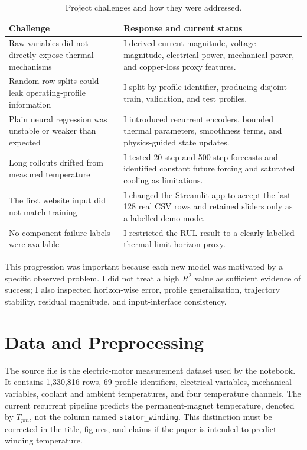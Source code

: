 \documentclass[conference]{IEEEtran}
\begin{document}
\begin{table}[!t]
\centering
\caption{Project challenges and how they were addressed.}
\label{tab:challenges}
\scriptsize
\begin{tabular}{p{}p{}}
\toprule
Challenge & Response and current status\\
\midrule
Raw variables did not directly expose thermal mechanisms & I derived current magnitude, voltage magnitude, electrical power, mechanical power, and copper-loss proxy features.\\
Random row splits could leak operating-profile information & I split by profile identifier, producing disjoint train, validation, and test profiles.\\
Plain neural regression was unstable or weaker than expected & I introduced recurrent encoders, bounded thermal parameters, smoothness terms, and physics-guided state updates.\\
Long rollouts drifted from measured temperature & I tested 20-step and 500-step forecasts and identified constant future forcing and saturated cooling as limitations.\\
The first website input did not match training & I changed the Streamlit app to accept the last 128 real CSV rows and retained sliders only as a labelled demo mode.\\
No component failure labels were available & I restricted the RUL result to a clearly labelled thermal-limit horizon proxy.\\
\bottomrule
\end{tabular}
\end{table}

This progression was important because each new model was motivated by a
specific observed problem. I did not treat a high $R^2$ value as sufficient
evidence of success; I also inspected horizon-wise error, profile
generalization, trajectory stability, residual magnitude, and input-interface
consistency.

\section{Data and Preprocessing}
The source file is the electric-motor measurement dataset used by the notebook.
It contains 1,330,816 rows, 69 profile identifiers, electrical variables,
mechanical variables, coolant and ambient temperatures, and four temperature
channels. The current recurrent pipeline predicts the permanent-magnet
temperature, denoted by $T_{pm}$, not the column named
\texttt{stator\_winding}. This distinction must be corrected in the title,
figures, and claims if the paper is intended to predict winding temperature.
\end{document}
